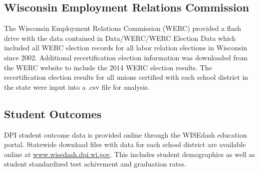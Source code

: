 \subsection{Wisconsin Employment Relations Commission}

The Wisconsin Employment Relations Commission (WERC) provided a flash drive with 
the data contained in Data/WERC/WERC Election Data which included all WERC 
election records for all labor relation elections in Wisconsin since 2002. 
Additional recertification election information was downloaded from the WERC 
website to include the 2014 WERC election results. The recertification election 
results for all unions certified with each school district in the state were 
input into a .csv file for analysis. 

\subsection*{Student Outcomes}

DPI student outcome data is provided online through the WISEdash education portal. 
Statewide download files with data for each school district are available online 
at \url{www.wisedash.dpi.wi.gov}. This includes student demographics as well as 
student standardized test achivement and graduation rates. 
